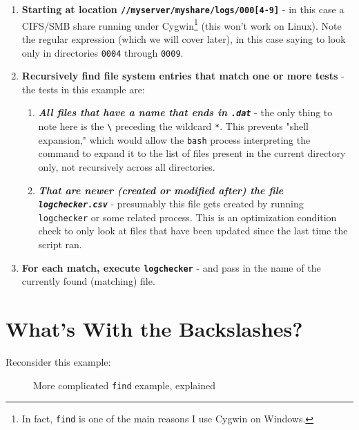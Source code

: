 \documentclass[10pt,american,]{book}
\newenvironment{Shaded}{\begin{snugshade}}{\end{snugshade}}
\newcommand{\KeywordTok}[1]{\textcolor[rgb]{0.13,0.29,0.53}{\textbf{{#1}}}}
\newcommand{\DataTypeTok}[1]{\textcolor[rgb]{0.13,0.29,0.53}{{#1}}}
\newcommand{\NormalTok}[1]{{#1}}
\numberwithin{figure}{chapter}
\DeclareRobustCommand{\drcap}[1]{\begin{figure}[H]\caption{#1}\end{figure}}
\renewcommand{\KeywordTok}[1]{{#1}}
\renewcommand{\DataTypeTok}[1]{{#1}}
\renewcommand{\NormalTok}[1]{{#1}}
\begin{document}
\begin{enumerate}
\def\labelenumi{\arabic{enumi}.}
\item
  \textbf{Starting at location
  \texttt{//myserver/myshare/logs/000{[}4-9{]}}} - in this case a
  CIFS/SMB share running under Cygwin\footnote{In fact, \texttt{find} is
    one of the main reasons I use Cygwin on Windows.} (this won't work
  on Linux). Note the regular expression (which we will cover later), in
  this case saying to look only in directories \texttt{0004} through
  \texttt{0009}.
\item
  \textbf{Recursively find file system entries that match one or more
  tests} - the tests in this example are:

  \begin{enumerate}
  \def\labelenumii{\alph{enumii}.}
  \item
    \textbf{\emph{All files that have a name that ends in
    \texttt{.dat}}} - the only thing to note here is the
    \texttt{\textbackslash{}} preceding the wildcard \texttt{*}. This
    prevents "shell expansion," which would allow the \texttt{bash}
    process interpreting the command to expand it to the list of files
    present in the current directory only, not recursively across all
    directories.
  \item
    \textbf{\emph{That are newer (created or modified after) the file
    \texttt{logchecker.csv}}} - presumably this file gets created by
    running \texttt{logchecker} or some related process. This is an
    optimization condition check to only look at files that have been
    updated since the last time the script ran.
  \end{enumerate}
\item
  \textbf{For each match, execute \texttt{logchecker}} - and pass in the
  name of the currently found (matching) file.
\end{enumerate}

\section*{What's With the
Backslashes?}\label{whats-with-the-backslashes}

Reconsider this example:

\drcap{More complicated \texttt{find} example, explained}

\begin{Shaded}
\end{Shaded}
\end{document}
